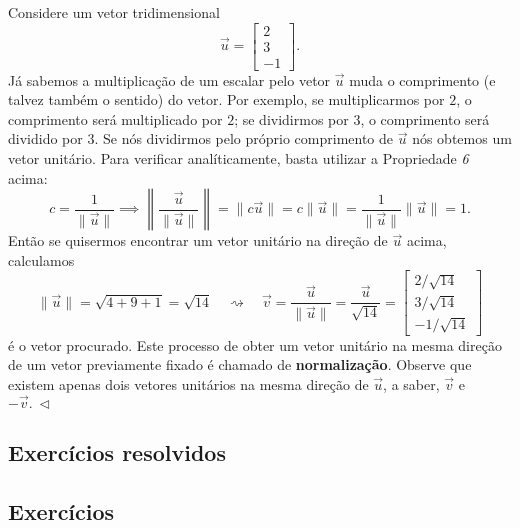 \documentclass[../livro.tex]{subfiles}  %
\begin{document}
\begin{example}
	Considere um vetor tridimensional
	\begin{equation}
	\vec{u} =
	\begin{bmatrix}
	2 \\ 3 \\ -1
	\end{bmatrix}.
	\end{equation} Já sabemos a multiplicação de um escalar pelo vetor $\vec{u}$ muda o comprimento (e talvez também o sentido) do vetor. Por exemplo, se multiplicarmos por $2$, o comprimento será multiplicado por $2$; se dividirmos por $3$, o comprimento será dividido por $3$. Se nós dividirmos pelo próprio comprimento de $\vec{u}$ nós obtemos um vetor unitário. Para verificar analíticamente, basta utilizar a Propriedade \textit{6} acima:
	\begin{equation}
	c = \frac{1}{\|\vec{u}\|} \implies \left\| \frac{\vec{u}}{\|\vec{u}\|} \right\| = \|c \vec{u} \| = c \|\vec{u}\| = \frac{1}{\|\vec{u}\|}\|\vec{u}\| = 1.
	\end{equation} Então se quisermos encontrar um vetor unitário na direção de $\vec{u}$ acima, calculamos
	\begin{equation}
	\|\vec{u}\| = \sqrt{4 + 9 + 1} = \sqrt{14} \quad \rightsquigarrow \quad \vec{v} = \frac{\vec{u}}{\|\vec{u}\|} = \frac{\vec{u}}{\sqrt{14}} =
	\begin{bmatrix}
	2/\sqrt{14} \\ 3/\sqrt{14} \\ -1/\sqrt{14}
	\end{bmatrix}
	\end{equation} é o vetor procurado. Este processo de obter um vetor unitário na mesma direção de um vetor previamente fixado é chamado de \textbf{normalização}. Observe que existem apenas dois vetores unitários na mesma direção de $\vec{u}$, a saber, $\vec{v}$ e $- \vec{v}. \ \lhd$
\end{example}

\subsection*{Exercícios resolvidos}

\construirExeresol

\subsection*{Exercícios}

\construirExer
\end{document}
